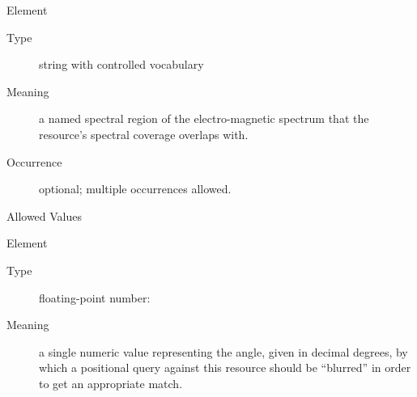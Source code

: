 \documentclass[11pt,a4paper]{ivoa}
\begin{document}
\begin{generated}
\begin{bigdescription}
\begin{description}
\end{description}
\item[Element \xmlel{waveband}]
\begin{description}
\item[Type] string with controlled vocabulary
\item[Meaning] 
                  a named spectral region of the electro-magnetic spectrum 
                  that the resource's spectral coverage overlaps with.
               
\item[Occurrence] optional; multiple occurrences allowed.

\item[Allowed Values]\hfil
{}

\end{description}
\item[Element \xmlel{regionOfRegard}]
\begin{description}
\item[Type] floating-point number: 
\item[Meaning] 
                  a single numeric value representing the angle, given
                  in decimal degrees, by which a positional query
                  against this resource should be “blurred” in order
                  to get an appropriate match. 
               

\end{description}
\end{bigdescription}
\end{generated}
\end{document}
